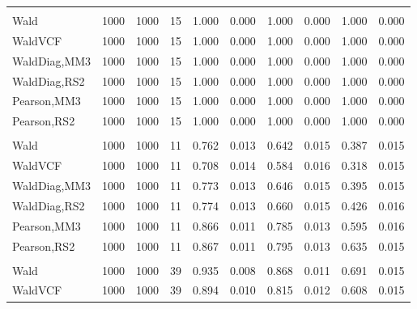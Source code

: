 \documentclass[
]{article}
\begin{document}
\begin{table}[H]
{\begin{tabular}[t]{lrrrrrrlrr}
\addlinespace[0.3em]
\multicolumn{10}{l}{\textbf{1F 15V}}\\
\hspace{1em}Wald & 1000 & 1000 & 15 & 1.000 & 0.000 & 1.000 & 0.000 & 1.000 & 0.000\\
\hspace{1em}WaldVCF & 1000 & 1000 & 15 & 1.000 & 0.000 & 1.000 & 0.000 & 1.000 & 0.000\\
\hspace{1em}WaldDiag,MM3 & 1000 & 1000 & 15 & 1.000 & 0.000 & 1.000 & 0.000 & 1.000 & 0.000\\
\hspace{1em}WaldDiag,RS2 & 1000 & 1000 & 15 & 1.000 & 0.000 & 1.000 & 0.000 & 1.000 & 0.000\\
\hspace{1em}Pearson,MM3 & 1000 & 1000 & 15 & 1.000 & 0.000 & 1.000 & 0.000 & 1.000 & 0.000\\
\hspace{1em}Pearson,RS2 & 1000 & 1000 & 15 & 1.000 & 0.000 & 1.000 & 0.000 & 1.000 & 0.000\\
\addlinespace[0.3em]
\multicolumn{10}{l}{\textbf{2F 10V}}\\
\hspace{1em}Wald & 1000 & 1000 & 11 & 0.762 & 0.013 & 0.642 & 0.015 & 0.387 & 0.015\\
\hspace{1em}WaldVCF & 1000 & 1000 & 11 & 0.708 & 0.014 & 0.584 & 0.016 & 0.318 & 0.015\\
\hspace{1em}WaldDiag,MM3 & 1000 & 1000 & 11 & 0.773 & 0.013 & 0.646 & 0.015 & 0.395 & 0.015\\
\hspace{1em}WaldDiag,RS2 & 1000 & 1000 & 11 & 0.774 & 0.013 & 0.660 & 0.015 & 0.426 & 0.016\\
\hspace{1em}Pearson,MM3 & 1000 & 1000 & 11 & 0.866 & 0.011 & 0.785 & 0.013 & 0.595 & 0.016\\
\hspace{1em}Pearson,RS2 & 1000 & 1000 & 11 & 0.867 & 0.011 & 0.795 & 0.013 & 0.635 & 0.015\\
\addlinespace[0.3em]
\multicolumn{10}{l}{\textbf{3F 15V}}\\
\hspace{1em}Wald & 1000 & 1000 & 39 & 0.935 & 0.008 & 0.868 & 0.011 & 0.691 & 0.015\\
\hspace{1em}WaldVCF & 1000 & 1000 & 39 & 0.894 & 0.010 & 0.815 & 0.012 & 0.608 & 0.015\\

\end{tabular}}
\end{table}
\end{document}
